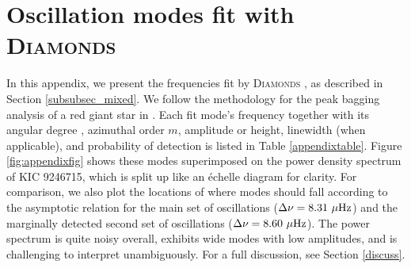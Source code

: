 \appendix
\section{Oscillation modes fit with \textsc{D\large{iamonds}}}
\label{appendix}

In this appendix, we present the frequencies fit by \textsc{D\large{iamonds}} \citep{cor14}, as described in Section \ref{subsubsec_mixed}. We follow the methodology for the peak bagging analysis of a red giant star in \citet{cor15}. Each fit mode's frequency together with its angular degree \ell, azimuthal order $m$, amplitude or height, linewidth (when applicable), and probability of detection is listed in Table \ref{appendixtable}. Figure \ref{fig:appendixfig} shows these modes superimposed on the power density spectrum of KIC 9246715, which is split up like an \'echelle diagram for clarity. For comparison, we also plot the locations of where modes should fall according to the asymptotic relation \citep{mos12} for the main set of oscillations ($\Delta \nu = 8.31 \ \mu \rm{Hz}$) and the marginally detected second set of oscillations ($\Delta \nu = 8.60 \ \mu \rm{Hz}$). The power spectrum is quite noisy overall, exhibits wide modes with low amplitudes, and is challenging to interpret unambiguously. For a full discussion, see Section \ref{discuss}.